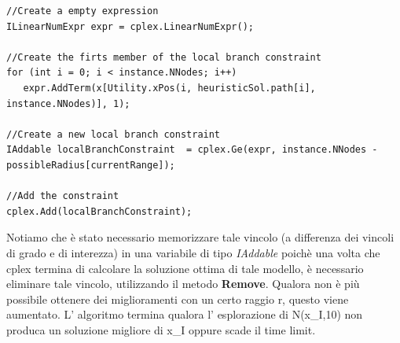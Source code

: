\documentclass[11pt]{article}
\begin{document}
\begin{lstlisting}
//Create a empty expression
ILinearNumExpr expr = cplex.LinearNumExpr();

//Create the firts member of the local branch constraint
for (int i = 0; i < instance.NNodes; i++)
   expr.AddTerm(x[Utility.xPos(i, heuristicSol.path[i], instance.NNodes)], 1);
   
//Create a new local branch constraint
IAddable localBranchConstraint  = cplex.Ge(expr, instance.NNodes - possibleRadius[currentRange]);

//Add the constraint 
cplex.Add(localBranchConstraint);               
\end{lstlisting}    

Notiamo che è stato necessario memorizzare tale vincolo (a differenza dei vincoli di grado e di interezza) in una variabile di tipo \emph{IAddable} poichè una volta che cplex termina di calcolare la soluzione ottima di tale modello, è necessario eliminare tale vincolo, utilizzando il metodo \textbf{Remove}. Qualora non è più possibile ottenere dei miglioramenti con un certo raggio r, questo viene aumentato. L' algoritmo termina qualora l' esplorazione di N(x_I,10) non produca un soluzione migliore di x_I oppure scade il time limit.
\end{document}

